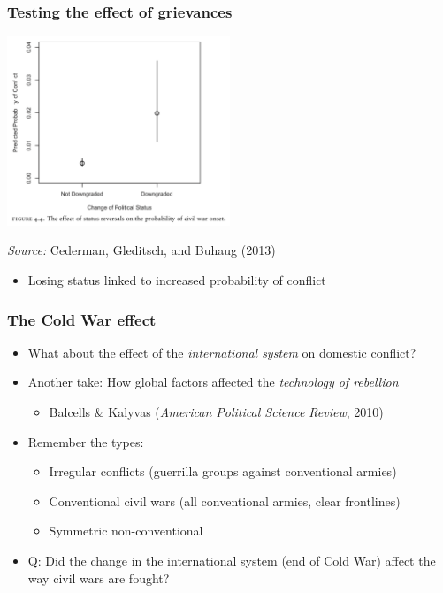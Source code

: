 \documentclass[aspectratio=43]{beamer}
\begin{document}
\begin{frame}
\frametitle{Testing the effect of grievances}
\centering

\includegraphics[width = 0.5\textwidth]{img/cgb_effect_downgrading}

\vspace{10pt}

{\small \textit{Source:} Cederman, Gleditsch, and Buhaug (2013)}

\vspace{15pt}

\begin{itemize}
  \item Losing status linked to increased probability of conflict
\end{itemize}

\end{frame}

\begin{frame}
\frametitle{The Cold War effect}
\centering

\begin{itemize}
  \item What about the effect of the \textit{international system} on domestic conflict?
  \item<2-> Another take: How global factors affected the \textit{technology of rebellion}
  \begin{itemize}
    \item[] {\footnotesize Balcells \& Kalyvas (\textit{American Political Science Review}, 2010)}
  \end{itemize}
  \item<3-> Remember the types:
  \begin{itemize}
    \item Irregular conflicts (guerrilla groups against conventional armies)
    \item Conventional civil wars (all conventional armies, clear frontlines)
    \item Symmetric non-conventional
  \end{itemize}
  \item<3-> Q: Did the change in the international system (end of Cold War) affect the way civil wars are fought?
\end{itemize}

\end{frame}
\end{document}
